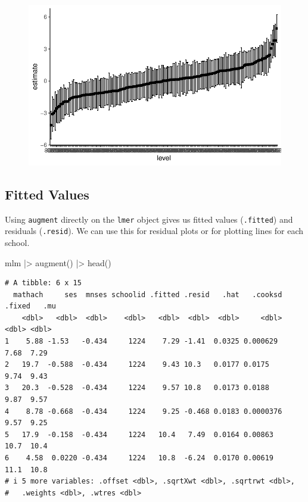 \documentclass[
  letterpaper,
  DIV=11,
  numbers=noendperiod]{scrreprt}
\newenvironment{Shaded}{\begin{snugshade}}{\end{snugshade}}
\newcommand{\FunctionTok}[1]{\textcolor[rgb]{0.02,0.16,0.49}{#1}}
\newcommand{\NormalTok}[1]{\textcolor[rgb]{0.00,0.44,0.13}{#1}}
\newcommand{\SpecialCharTok}[1]{\textcolor[rgb]{0.25,0.44,0.63}{#1}}
\begin{document}
\begin{figure}[H]

{\centering \includegraphics{broom_files/figure-pdf/unnamed-chunk-11-1.pdf}

}

\end{figure}

\hypertarget{fitted-values}{%
\subsection{Fitted Values}\label{fitted-values}}

Using \texttt{augment} directly on the \texttt{lmer} object gives us
fitted values (\texttt{.fitted}) and residuals (\texttt{.resid}). We can
use this for residual plots or for plotting lines for each school.

\begin{Shaded}
\begin{Highlighting}[]
\NormalTok{mlm }\SpecialCharTok{|\textgreater{}} 
  \FunctionTok{augment}\NormalTok{() }\SpecialCharTok{|\textgreater{}} 
  \FunctionTok{head}\NormalTok{()}
\end{Highlighting}
\end{Shaded}

\begin{verbatim}
# A tibble: 6 x 15
  mathach     ses  mnses schoolid .fitted .resid   .hat   .cooksd .fixed   .mu
    <dbl>   <dbl>  <dbl>    <dbl>   <dbl>  <dbl>  <dbl>     <dbl>  <dbl> <dbl>
1    5.88 -1.53   -0.434     1224    7.29 -1.41  0.0325 0.000629    7.68  7.29
2   19.7  -0.588  -0.434     1224    9.43 10.3   0.0177 0.0175      9.74  9.43
3   20.3  -0.528  -0.434     1224    9.57 10.8   0.0173 0.0188      9.87  9.57
4    8.78 -0.668  -0.434     1224    9.25 -0.468 0.0183 0.0000376   9.57  9.25
5   17.9  -0.158  -0.434     1224   10.4   7.49  0.0164 0.00863    10.7  10.4 
6    4.58  0.0220 -0.434     1224   10.8  -6.24  0.0170 0.00619    11.1  10.8 
# i 5 more variables: .offset <dbl>, .sqrtXwt <dbl>, .sqrtrwt <dbl>,
#   .weights <dbl>, .wtres <dbl>
\end{verbatim}
\end{document}
